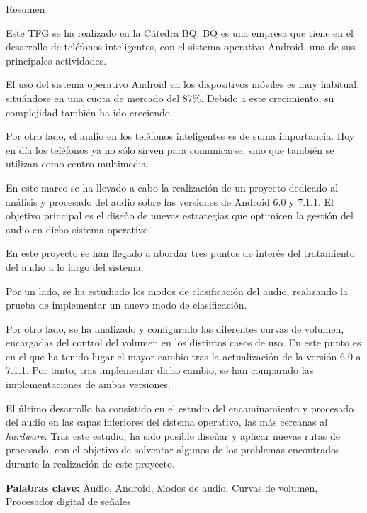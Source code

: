 \begin{center}
\Large{Resumen}
\end{center}


\bigskip

Este \gls{TFG} se ha realizado en la Cátedra BQ. BQ es una empresa que tiene en el desarrollo de teléfonos inteligentes, con el sistema operativo Android, una de sus principales actividades. 

El uso del sistema operativo Android en los dispositivos móviles es muy habitual, situándose en una cuota de mercado del 87\%. Debido a este crecimiento, su complejidad también ha ido creciendo.

Por otro lado, el audio en los teléfonos inteligentes es de suma importancia. Hoy en día los teléfonos ya no sólo sirven para comunicarse, sino que también se utilizan como centro multimedia.

En este marco se ha llevado a cabo la realización de un proyecto dedicado al análisis y procesado del audio sobre las versiones de Android 6.0 y 7.1.1. El objetivo principal es el diseño de nuevas estrategias que optimicen la gestión del audio en dicho sistema operativo.

En este proyecto se han llegado a abordar tres puntos de interés del tratamiento del audio a lo largo del sistema.

Por un lado, se ha estudiado los modos de clasificación del audio, realizando la prueba de implementar un nuevo modo de clasificación. 

Por otro lado, se ha analizado y configurado las diferentes curvas de volumen, encargadas del control del volumen en los distintos casos de uso. En este punto es en el que ha tenido lugar el mayor cambio tras la actualización de la versión 6.0 a 7.1.1. Por tanto, tras implementar dicho cambio, se han comparado las implementaciones de ambas versiones.

El último desarrollo ha consistido en el estudio del encaminamiento y procesado del audio en las capas inferiores del sistema operativo, las más cercanas al \textit{hardware}. Tras este estudio, ha sido posible diseñar y aplicar nuevas rutas de procesado, con el objetivo de solventar algunos de los problemas encontrados durante la realización de este proyecto.


\bigskip
\bigskip
\bigskip
\bigskip
\bigskip

\textbf{Palabras clave:} Audio, Android, Modos de audio, Curvas de volumen, Procesador digital de señales